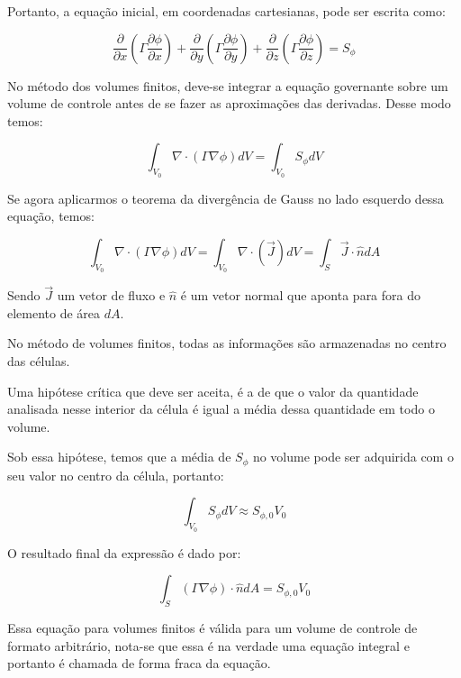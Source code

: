 Portanto, a equação inicial, em coordenadas cartesianas, pode ser escrita como:

\begin{equation}
    \frac{\partial}{\partial x} \left( \Gamma \frac{\partial \phi}{\partial x} \right) + \frac{\partial}{\partial y} \left( \Gamma \frac{\partial \phi}{\partial y} \right) + \frac{\partial}{\partial z} \left( \Gamma \frac{\partial \phi}{\partial z} \right) = S_\phi
\end{equation}

No método dos volumes finitos, deve-se integrar a equação governante sobre um volume de controle antes de se fazer as aproximações das derivadas. Desse modo temos:

\begin{equation}
    \int_{V_0} \nabla \cdot (\Gamma \nabla \phi) dV = \int_{V_0} S_\phi dV
\end{equation}

Se agora aplicarmos o teorema da divergência de Gauss no lado esquerdo dessa equação, temos:

\begin{equation}
    \int_{V_0} \nabla \cdot (\Gamma \nabla \phi) dV = \int_{V_0} \nabla \cdot (\vec{J}) dV = \int_S \vec{J} \cdot \hat{n} dA
\end{equation}

Sendo $\vec{J}$ um vetor de fluxo e $\hat{n}$ é um vetor normal que aponta para fora do elemento de área $dA$.

No método de volumes finitos, todas as informações são armazenadas no centro das células.

Uma hipótese crítica que deve ser aceita, é a de que o valor da quantidade analisada nesse interior da célula é igual a média dessa quantidade em todo o volume.

Sob essa hipótese, temos que a média de $S_\phi$ no volume pode ser adquirida com o seu valor no centro da célula, portanto:

\begin{equation}
    \int_{V_0} S_\phi dV \approx S_{\phi,0} V_0
\end{equation}

O resultado final da expressão é dado por:

\begin{equation}
    \int_S (\Gamma \nabla \phi) \cdot \hat{n} dA = S_{\phi,0} V_0
\end{equation}

Essa equação para volumes finitos é válida para um volume de controle de formato arbitrário, nota-se que essa é na verdade uma equação integral e portanto é chamada de forma fraca da equação.

